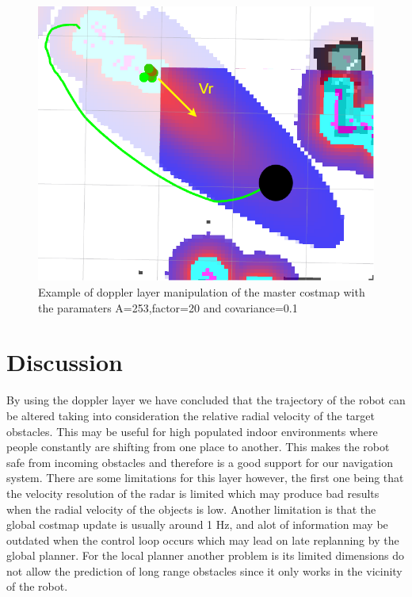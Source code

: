 \begin{figure}[ht!] 
\centerline{\includegraphics [width=1.0 \textwidth]{imgs/chapter6/doppler.png}}
\caption[Doppler layer manipulation of the master costmap]{Example of doppler layer manipulation of the master costmap with the paramaters  A=253,factor=20 and covariance=0.1}
\label{fig::doppler}
\end{figure}
\section{Discussion}
By using the doppler layer we have concluded that the trajectory of the robot can be altered taking into consideration the relative radial velocity of the target obstacles. This may be useful for high populated indoor environments where people constantly are shifting from one place to another. This makes the robot safe from incoming obstacles and therefore is a good support for our navigation system. There are some limitations for this layer however, the first one being that the velocity resolution of the radar is limited which may produce bad results when the radial velocity of the objects is low. Another limitation is that the global costmap update is usually around 1 Hz, and alot of information may be outdated when the control loop occurs which may lead on late replanning by the global planner. For the local planner another problem is its limited dimensions do not allow the prediction of long range obstacles since it only works in the vicinity of the robot.


